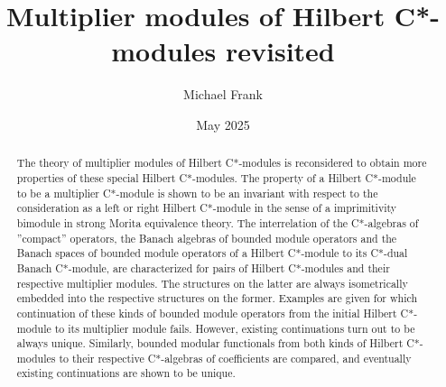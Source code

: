 \documentclass{amsart}
\theoremstyle{definition}
\begin{document}
\title[Multiplier modules of Hilbert C*-modules revisited]{Multiplier modules of Hilbert C*-modules revisited}
\author{Michael Frank} 
\address{Hochschule f\"ur Technik, Wirtschaft und Kultur (HTWK) Leipzig, Fakult\"at Informatik und Medien, PF 301166, D-04251 Leipzig, Germany, ORCID 0000-0001-8972-2154.}



\date{May 2025}

\begin{abstract}
The theory of multiplier modules of Hilbert C*-modules is reconsidered to obtain more properties of these special Hilbert C*-modules. The property of a Hilbert C*-module to be a multiplier C*-module is shown to be an invariant with respect to the consideration as a left or right Hilbert C*-module in the sense of a imprimitivity bimodule in strong Morita equivalence theory. The interrelation of the C*-algebras of ''compact'' operators, the Banach algebras of bounded module operators and the Banach spaces of bounded module operators of a Hilbert C*-module to its C*-dual Banach C*-module, are characterized for pairs of Hilbert C*-modules and their respective multiplier modules. The structures on the latter are always isometrically embedded into the respective structures on the former. Examples are given for which continuation of these kinds of bounded module operators from the initial Hilbert C*-module to its multiplier module fails. However, existing continuations turn out to be always unique. Similarly, bounded modular functionals from both kinds of Hilbert C*-modules to their respective C*-algebras of coefficients are compared, and eventually existing continuations are shown to be unique.
\end{abstract}

\maketitle




\end{document}
